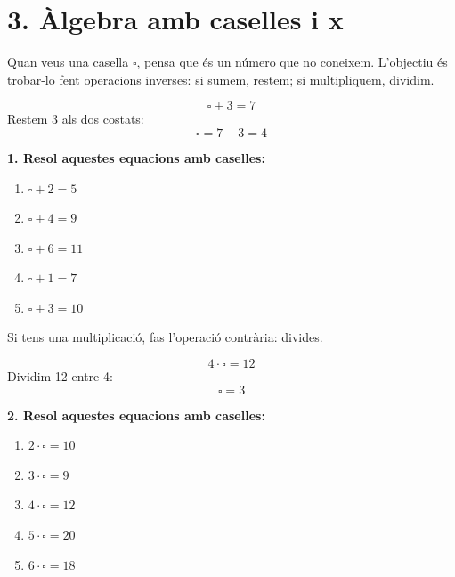\documentclass[12pt,a4paper]{article}
\begin{document}
\newpage



\section*{3. Àlgebra amb caselles i x}

\begin{capsula}
Quan veus una casella $\square$, pensa que és un número que no coneixem. L'objectiu és trobar-lo fent operacions inverses: si sumem, restem; si multipliquem, dividim.
\end{capsula}

\begin{exemple}
\[
\square + 3 = 7
\]
Restem 3 als dos costats:
\[
\square = 7 - 3 = 4
\]
\end{exemple}

\textbf{1. Resol aquestes equacions amb caselles:}
\begin{enumerate}[label=\alph*)]
    \item $\square + 2 = 5$ \vspace{0.8cm}
    \item $\square + 4 = 9$ \vspace{0.8cm}
    \item $\square + 6 = 11$ \vspace{0.8cm}
    \item $\square + 1 = 7$ \vspace{0.8cm}
    \item $\square + 3 = 10$ \vspace{0.8cm}
\end{enumerate}

\begin{capsula}
Si tens una multiplicació, fas l'operació contrària: divides.
\end{capsula}

\begin{exemple}
\[
4\cdot \square = 12
\]
Dividim 12 entre 4:
\[
\square = 3
\]
\end{exemple}

\textbf{2. Resol aquestes equacions amb caselles:}
\begin{enumerate}[label=\alph*)]
    \item $2\cdot \square = 10$ \vspace{0.8cm}
    \item $3\cdot \square = 9$ \vspace{0.8cm}
    \item $4\cdot \square = 12$ \vspace{0.8cm}
    \item $5\cdot \square = 20$ \vspace{0.8cm}
    \item $6\cdot \square = 18$ \vspace{0.8cm}
\end{enumerate}
\end{document}
